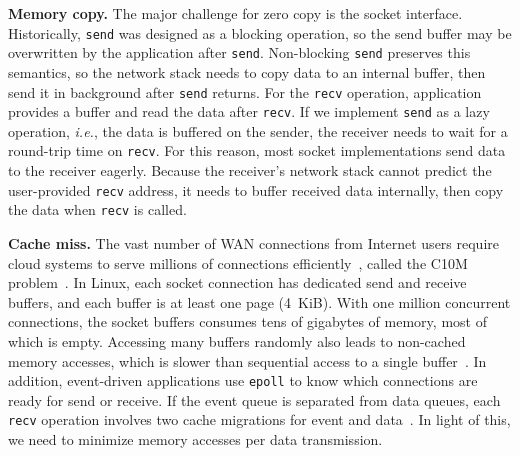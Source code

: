 \textbf{Memory copy.}
The major challenge for zero copy is the socket interface.
Historically, \texttt{send} was designed as a blocking operation, so the send buffer may be overwritten by the application after \texttt{send}.
Non-blocking \texttt{send} preserves this semantics, so the network stack needs to copy data to an internal buffer, then send it in background after \texttt{send} returns.
For the \texttt{recv} operation, application provides a buffer and read the data after \texttt{recv}.
If we implement \texttt{send} as a lazy operation, \textit{i.e.}, the data is buffered on the sender, the receiver needs to wait for a round-trip time on \texttt{recv}.
For this reason, most socket implementations send data to the receiver eagerly.
Because the receiver's network stack cannot predict the user-provided \texttt{recv} address, it needs to buffer received data internally, then copy the data when \texttt{recv} is called.

\textbf{Cache miss.}
The vast number of WAN connections from Internet users require cloud systems to serve millions of connections efficiently~\cite{nishtala2013scaling,lin2016scalable,belay2017ix}, called the C10M problem~\cite{graham2013c10m}. In Linux, each socket connection has dedicated send and receive buffers, and each buffer is at least one page (4~KiB). With one million concurrent connections, the socket buffers consumes tens of gigabytes of memory, most of which is empty. Accessing many buffers randomly also leads to non-cached memory accesses, which is slower than sequential access to a single buffer~\cite{li2017kv}. In addition, event-driven applications use \texttt{epoll} to know which connections are ready for send or receive. If the event queue is separated from data queues, each \texttt{recv} operation involves two cache migrations for event and data~\cite{yasukata2016stackmap}. In light of this, we need to minimize memory accesses per data transmission.

